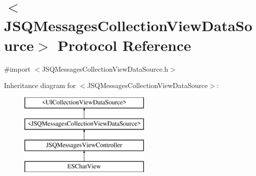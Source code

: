 \hypertarget{protocol_j_s_q_messages_collection_view_data_source-p}{}\section{$<$J\+S\+Q\+Messages\+Collection\+View\+Data\+Source$>$ Protocol Reference}
\label{protocol_j_s_q_messages_collection_view_data_source-p}


{\ttfamily \#import $<$J\+S\+Q\+Messages\+Collection\+View\+Data\+Source.\+h$>$}

Inheritance diagram for $<$J\+S\+Q\+Messages\+Collection\+View\+Data\+Source$>$\+:\begin{figure}[H]
\begin{center}
\leavevmode
\includegraphics[height=4.000000cm]{protocol_j_s_q_messages_collection_view_data_source-p}
\end{center}
\end{figure}

